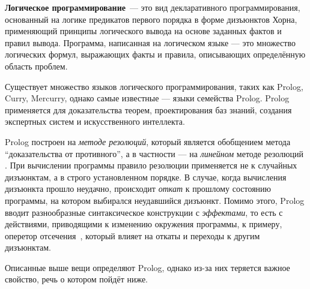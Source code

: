 {\bf Логическое программирование}~--- это вид декларативного программирования,
основанный на логике предикатов первого порядка в форме дизъюнктов Хорна,
применяющий принципы логического вывода на основе заданных фактов и правил вывода.
Программа, написанная на логическом языке --- это множество логических формул,
выражающих факты и правила, описывающих определённую область проблем.
\cite{logicMJ}

Существует множество языков логического программирования, таких как Prolog, Curry, Mercurry,
однако самые известные --- языки семейства Prolog. Prolog применяется для доказательства
теорем, проектирования баз знаний, создания экспертных систем и искусственного интеллекта.

Prolog построен на \emph{методе резолюций}, который является обобщением метода
``доказательства от противного'', а в частности --- на \emph{линейном} методе
резолюций .
При вычислении программы правило резолюции применяется не к случайных дизъюнктам,
а в строго установленном порядке. В случае, когда вычисления дизъюнкта прошло
неудачно, происходит \emph{откат} к прошлому состоянию программы, на котором
выбирался неудавшийся дизъюнкт\cite{logicMJ}.
Помимо этого, Prolog вводит разнообразные синтаксическое конструкции с \emph{эффектами},
то есть с действиями, приводящими к изменению окружения программы,
к примеру, оперетор отсечения~, который влияет на откаты и переходы к другим дизъюнктам.

Описанные выше вещи определяют Prolog, однако из-за них теряется важное свойство,
речь о котором пойдёт ниже.

% 
% 
% 
